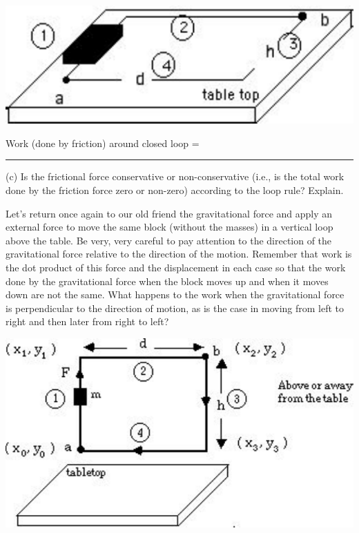 \vspace{0.3cm}
{\par\raggedright \includegraphics{conservative/conservative_fig3.pdf} \par}
\vspace{0.3cm}

\answerspace{20mm}

\hspace{1.5cm}Work (done by friction) around closed loop = \rule{1.5in}{0.1pt}

\answerspace{10mm}

(c) Is the frictional force conservative or non-conservative (i.e., 
is the total work done by the friction force zero or non-zero) according to the loop rule? Explain.
\answerspace{20mm}

Let's return once again to our old friend the gravitational force and apply
an external force to move the same block (without the masses) in a vertical
loop above the table. Be very, very careful to pay attention to the direction
of the gravitational force relative to the direction of the motion. Remember
that work is the dot product of this force and the displacement in each case
so that the work done by the gravitational force when the block moves up and
when it moves down are not the same. What happens to the work when the gravitational force is perpendicular to the direction of motion, as is the case in moving from left to right and then later from right to left?

\vspace{0.3cm}
{\par\centering \includegraphics{conservative/conservative_fig4.pdf} \par}
\vspace{0.3cm}

